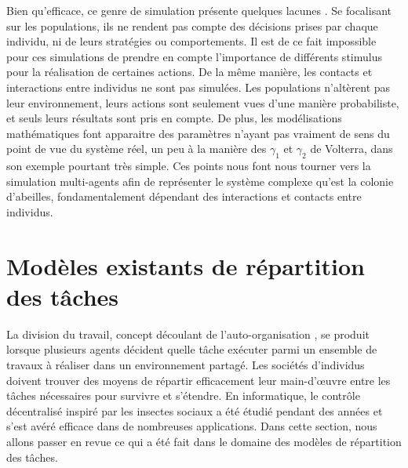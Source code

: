 		Bien qu'efficace, ce genre de simulation présente quelques lacunes \cite{drogoul_multi-agent_1992}. Se focalisant sur les populations, ils ne rendent pas compte des décisions prises par chaque individu, ni de leurs stratégies ou comportements. Il est de ce fait impossible pour ces simulations de prendre en compte l'importance de différents stimulus pour la réalisation de certaines actions. De la même manière, les contacts et interactions entre individus ne sont pas simulées. Les populations n'altèrent pas leur environnement, leurs actions sont seulement vues d'une manière probabiliste, et seuls leurs résultats sont pris en compte. De plus, les modélisations mathématiques font apparaitre des paramètres n'ayant pas vraiment de sens du point de vue du système réel, un peu à la manière des $\gamma_1$ et $\gamma_2$ de Volterra, dans son exemple pourtant très simple. Ces points nous font nous tourner vers la simulation multi-agents afin de représenter le système complexe qu'est la colonie d'abeilles, fondamentalement dépendant des interactions et contacts entre individus.
			
			
	\section{Modèles existants de répartition des tâches}
	La division du travail, concept découlant de l'auto-organisation \cite{labella_division_2006}, se produit lorsque plusieurs agents décident quelle tâche exécuter parmi un ensemble de travaux à réaliser dans un environnement partagé. Les sociétés d'individus doivent trouver des moyens de répartir efficacement leur main-d'œuvre entre les tâches nécessaires pour survivre et s'étendre. En informatique, le contrôle décentralisé inspiré par les insectes sociaux a été étudié pendant des années et s'est avéré efficace dans de nombreuses applications. Dans cette section, nous allons passer en revue ce qui a été fait dans le domaine des modèles de répartition des tâches.
	
	
